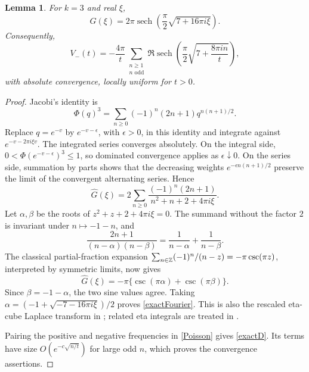 \documentclass[11pt]{amsart}
\newtheorem{lemma}[theorem]{Lemma}
\theoremstyle{definition}
\theoremstyle{remark}
\numberwithin{equation}{section}
\newcommand{\sech}{\operatorname{sech}}
\begin{document}
\begin{lemma}\label{cubictransform}
For $k=3$ and real $\xi$,
\begin{equation}\label{exactFourier}
 \widehat G(\xi)=2\pi\sech\!\left(\frac\pi2\sqrt{7+16\pi i\xi}\right).
\end{equation}
Consequently,
\begin{equation}\label{exactD}
 V_-(t)=-\frac{4\pi}{t}
 \sum_{\substack{n\ge1\\n\text{ odd}}}
 \Re\sech\!\left(\frac\pi2\sqrt{7+\frac{8\pi in}{t}}\right),
\end{equation}
with absolute convergence, locally uniform for $t>0$.
\end{lemma}
\begin{proof}
Jacobi's identity is
\[
 \Phi(q)^3=\sum_{n\ge0}(-1)^n(2n+1)q^{n(n+1)/2}.
\]
Replace $q=e^{-v}$ by $e^{-v-\epsilon}$, with $\epsilon>0$, in this identity and integrate against $e^{-v-2\pi i\xi v}$. The integrated series converges absolutely. On the integral side, $0<\Phi(e^{-v-\epsilon})^3\le1$, so dominated convergence applies as $\epsilon\downarrow0$. On the series side, summation by parts shows that the decreasing weights $e^{-\epsilon n(n+1)/2}$ preserve the limit of the convergent alternating series. Hence
\[
 \widehat G(\xi)=2\sum_{n\ge0}
 \frac{(-1)^n(2n+1)}{n^2+n+2+4\pi i\xi}.
\]
Let $\alpha,\beta$ be the roots of $z^2+z+2+4\pi i\xi=0$. The summand without the factor $2$ is invariant under $n\mapsto-1-n$, and
\[
 \frac{2n+1}{(n-\alpha)(n-\beta)}
       =\frac1{n-\alpha}+\frac1{n-\beta}.
\]
The classical partial-fraction expansion
$\sum_{n\in\mathbb Z}(-1)^n/(n-z)=-\pi\csc(\pi z)$, interpreted by symmetric limits, now gives
\[
 \widehat G(\xi)=-\pi\{\csc(\pi\alpha)+\csc(\pi\beta)\}.
\]
Since $\beta=-1-\alpha$, the two sine values agree. Taking
$\alpha=(-1+\sqrt{-7-16\pi i\xi})/2$ proves \eqref{exactFourier}. This is also the rescaled eta-cube Laplace transform in \cite[eq.~(14)]{Glasser}; related eta integrals are treated in \cite{Coffey}.

Pairing the positive and negative frequencies in \eqref{Poisson} gives \eqref{exactD}. Its terms have size $O(e^{-c\sqrt{n/t}})$ for large odd $n$, which proves the convergence assertions.
\end{proof}
\end{document}
